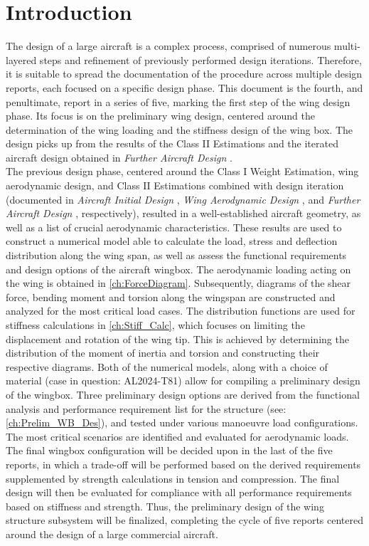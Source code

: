 \chapter{Introduction}
The design of a large aircraft is a complex process, comprised of numerous multi-layered steps and refinement of previously performed design iterations. Therefore, it is suitable to spread the documentation of the procedure across multiple design reports, each focused on a specific design phase. This document is the fourth, and penultimate, report in a series of five, marking the first step of the wing design phase. Its focus is on the preliminary wing design, centered around the determination of the wing loading and the stiffness design of the wing box. The design picks up from the results of the Class II Estimations and the iterated aircraft design obtained in \textit{Further Aircraft Design} \cite{Koppejan2024WorkDesign}.\\

\noindent The previous design phase, centered around the Class I Weight Estimation, wing aerodynamic design, and Class II Estimations combined with design iteration (documented in \textit{Aircraft Initial Design} \cite{Koppejan2024Aircraft1}, \textit{Wing Aerodynamic Design} \cite{Koppejan2024WingDesign}, and \textit{Further Aircraft Design} \cite{Koppejan2024WorkDesign}, respectively), resulted in a well-established aircraft geometry, as well as a list of crucial aerodynamic characteristics. These results are used to construct a numerical model able to calculate the load, stress and deflection distribution along the wing span, as well as assess the functional requirements and design options of the aircraft wingbox. The aerodynamic loading acting on the wing is obtained in \autoref{ch:ForceDiagram}. Subsequently, diagrams of the shear force, bending moment and torsion along the wingspan are constructed and analyzed for the most critical load cases. The distribution functions are used for stiffness calculations in \autoref{ch:Stiff_Calc}, which focuses on limiting the displacement and rotation of the wing tip. This is achieved by determining the distribution of the moment of inertia and torsion and constructing their respective diagrams. Both of the numerical models, along with a choice of material (case in question: AL2024-T81) allow for compiling a preliminary design of the wingbox. Three preliminary design options are derived from the functional analysis and performance requirement list for the structure (see: \autoref{ch:Prelim_WB_Des}), and tested under various manoeuvre load configurations. The most critical scenarios are identified and evaluated for aerodynamic loads.\\
    
\noindent The final wingbox configuration will be decided upon in the last of the five reports, in which a trade-off will be performed based on the derived requirements supplemented by strength calculations in tension and compression. The final design will then be evaluated for compliance with all performance requirements based on stiffness and strength. Thus, the preliminary design of the wing structure subsystem will be finalized, completing the cycle of five reports centered around the design of a large commercial aircraft.